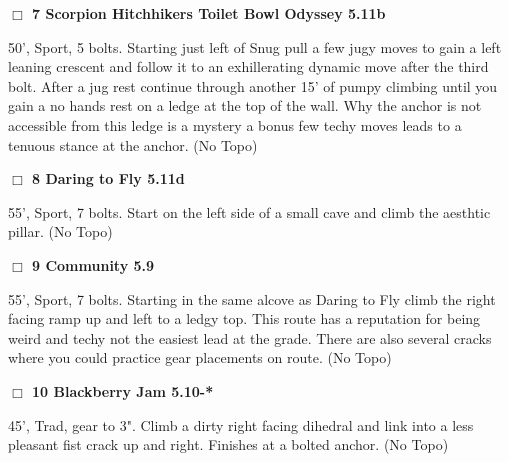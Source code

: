 \begin{multicols}{2}
\needspace{1.5cm}
\label{rt:Scorpion Hitchhikers Toilet Bowl Odyssey}
\colorbox{RoyalBlue!20}{
\parbox{0.95\linewidth}{
\hspace{-1ex}\textbf{$\Box$
7 Scorpion Hitchhikers Toilet Bowl Odyssey 5.11b  
}}}
\begin{adjustwidth}{1.3em}{}			
50', Sport, 5 bolts. Starting just left of Snug pull a few jugy moves to gain a left leaning crescent and follow it to an exhillerating dynamic move after the third bolt. After a jug rest continue through another 15' of pumpy climbing until you gain a no hands rest on a ledge at the top of the wall. Why the anchor is not accessible from this ledge is a mystery a bonus few techy moves leads to a tenuous stance at the anchor.
  (No Topo)
\end{adjustwidth}




\needspace{1.5cm}
\label{rt:Daring to Fly}
\colorbox{RoyalBlue!20}{
\parbox{0.95\linewidth}{
\hspace{-1ex}\textbf{$\Box$
8 Daring to Fly 5.11d  
}}}
\begin{adjustwidth}{1.3em}{}			
55', Sport, 7 bolts. Start on the left side of a small cave and climb the aesthtic pillar.
  (No Topo)
\end{adjustwidth}




\needspace{1.5cm}
\label{rt:Community}
\colorbox{green!20}{
\parbox{0.95\linewidth}{
\hspace{-1ex}\textbf{$\Box$
9 Community 5.9  
}}}
\begin{adjustwidth}{1.3em}{}			
55', Sport, 7 bolts. Starting in the same alcove as Daring to Fly climb the right facing ramp up and left to a ledgy top. This route has a reputation for being weird and techy not the easiest lead at the grade. There are also several cracks where you could practice gear placements on route.
  (No Topo)
\end{adjustwidth}




\needspace{1.5cm}
\label{rt:Blackberry Jam}
\colorbox{RoyalBlue!20}{
\parbox{0.95\linewidth}{
\hspace{-1ex}\textbf{$\Box$
10 Blackberry Jam 5.10-*  
}}}
\begin{adjustwidth}{1.3em}{}			
45', Trad, gear to 3". Climb a dirty right facing dihedral and link into a less pleasant fist crack up and right. Finishes at a bolted anchor.
  (No Topo)
\end{adjustwidth}





\end{multicols}
